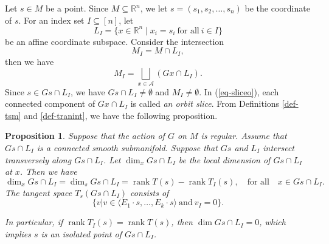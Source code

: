 \documentclass[10pt,a4paper]{amsart}
\newtheorem{proposition}[theorem]{Proposition}
\numberwithin{equation}{section}
\begin{document}
Let $s\in M$ be a point. Since $M\subseteq \mathbb{R}^n$, we let $s=(s_1,s_2,\ldots,s_n)$ be the coordinate of $s$. For an index set $I\subseteq [n]$, let 
\begin{equation}\label{eq-LI}
L_I=\{x \in \mathbb{R}^n\mid x_i=s_i~\text{for all}~i\in I\}  
\end{equation}
be an affine coordinate subspace. Consider the intersection 
\begin{equation}\label{eq-MI}
M_I=M\cap L_I,
\end{equation}
then we have
\begin{equation}\label{eq-sliceo}
M_I=\bigsqcup_{x\in \mathcal{A}} (Gx\cap L_I).
\end{equation}
Since $s\in Gs\cap L_I$, we have $Gs\cap L_I\neq \emptyset$ and $M_I\neq \emptyset$. In (\ref{eq-sliceo}), each connected component of $Gx\cap L_I$ is called \emph{an orbit slice}. From Definitions \ref{def-tsm} and \ref{def-tranint}, we have the following proposition.

\begin{proposition}\label{prop-dim}
Suppose that the action of $G$ on $M$ is regular.
Assume that $Gs\cap L_I$ is a connected smooth submanifold. Suppose that
$Gs$ and $L_I$ intersect transversely along $Gs\cap L_I$.
Let  $\dim_x Gs\cap L_I$ be the local dimension of $Gs\cap L_I$ at $x$. Then we have 
$$\dim_x Gs\cap L_I=\dim_s Gs\cap L_I=\operatorname{rank}T(s)-\operatorname{rank}T_I(s),\quad\text{for all}\quad x\in Gs\cap L_I.$$
The tangent space $T_s (Gs\cap L_I)$ consists of 
$$\{v|v\in \langle E_1\cdot s,\ldots, E_k \cdot s \rangle~\text{and}~ v_I=0\}.$$

In particular, if $\operatorname{rank}T_I(s)=\operatorname{rank}T(s)$, then $\dim Gs\cap L_I=0$, which implies $s$ is an isolated point of $Gs\cap L_I$.
\end{proposition}
\end{document}
